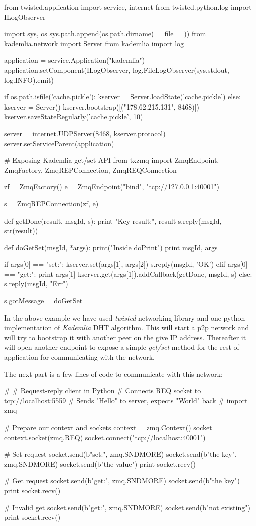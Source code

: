 \begin{python}
from twisted.application import service, internet
from twisted.python.log import ILogObserver

import sys, os
sys.path.append(os.path.dirname(__file__))
from kademlia.network import Server
from kademlia import log

application = service.Application("kademlia")
application.setComponent(ILogObserver, 
	log.FileLogObserver(sys.stdout, log.INFO).emit)

if os.path.isfile('cache.pickle'):
    kserver = Server.loadState('cache.pickle')
else:
    kserver = Server()
    kserver.bootstrap([("178.62.215.131", 8468)])
kserver.saveStateRegularly('cache.pickle', 10)

server = internet.UDPServer(8468, kserver.protocol)
server.setServiceParent(application)


# Exposing Kademlia get/set API
from txzmq import ZmqEndpoint, ZmqFactory, ZmqREPConnection,
 ZmqREQConnection

zf = ZmqFactory()
e = ZmqEndpoint("bind", "tcp://127.0.0.1:40001")

s = ZmqREPConnection(zf, e)

def getDone(result, msgId, s):
    print "Key result:", result
    s.reply(msgId, str(result))

def doGetSet(msgId, *args):
    print("Inside doPrint")
    print msgId, args

    if args[0] == "set:":
        kserver.set(args[1], args[2])
        s.reply(msgId, 'OK')
    elif args[0] == "get:":
        print args[1]
        kserver.get(args[1]).addCallback(getDone, msgId, s)
    else:
        s.reply(msgId, "Err")

s.gotMessage = doGetSet
\end{python}

In the above example we have used \textit{twisted} networking library\cite{TwistedMatrix} and one
python implementation\cite{KademliaImpl} of \textit{Kademlia} DHT algorithm\cite{KademliaPaper}. 
This will start a p2p network and will try to bootstrap it with another peer on the give IP address.
Thereafter it will open another endpoint to expose a simple \textit{get/set} method for the rest of
application for communicating with the network.

The next part is a few lines of code to communicate with this network:

\begin{python}
#
# Request-reply client in Python
# Connects REQ socket to tcp://localhost:5559
# Sends "Hello" to server, expects "World" back
#
import zmq

# Prepare our context and sockets
context = zmq.Context()
socket = context.socket(zmq.REQ)
socket.connect("tcp://localhost:40001")

# Set request
socket.send(b"set:", zmq.SNDMORE)
socket.send(b"the key", zmq.SNDMORE)
socket.send(b"the value")
print socket.recv()

# Get request
socket.send(b"get:", zmq.SNDMORE)
socket.send(b"the key")
print socket.recv()

# Invalid get
socket.send(b"get:", zmq.SNDMORE)
socket.send(b"not existing")
print socket.recv()
\end{python}

